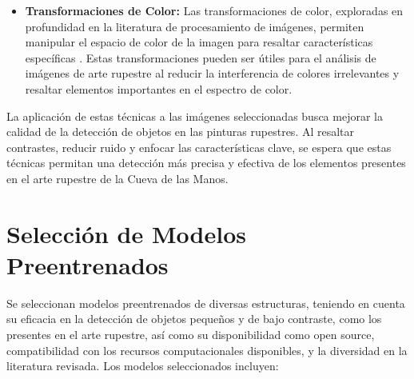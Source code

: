 \begin{itemize}
    \item \textbf{Transformaciones de Color:} Las transformaciones de color, exploradas en profundidad en la literatura de procesamiento de imágenes, permiten manipular el espacio de color de la imagen para resaltar características específicas \cite{gonzalesWood}. Estas transformaciones pueden ser útiles para el análisis de imágenes de arte rupestre al reducir la interferencia de colores irrelevantes y resaltar elementos importantes en el espectro de color.
\end{itemize}

La aplicación de estas técnicas a las imágenes seleccionadas busca mejorar la calidad de la detección de objetos en las pinturas rupestres. Al resaltar contrastes, reducir ruido y enfocar las características clave, se espera que estas técnicas permitan una detección más precisa y efectiva de los elementos presentes en el arte rupestre de la Cueva de las Manos.

\section{Selección de Modelos Preentrenados}
Se seleccionan modelos preentrenados de diversas estructuras, teniendo en cuenta su eficacia en la detección de objetos pequeños y de bajo contraste, como los presentes en el arte rupestre, así como su disponibilidad como open source, compatibilidad con los recursos computacionales disponibles, y la diversidad en la literatura revisada. Los modelos seleccionados incluyen:

